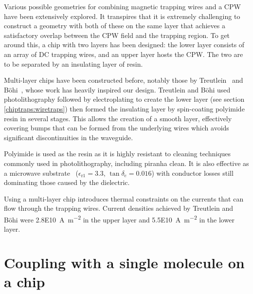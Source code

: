 Various possible geometries for combining magnetic trapping wires and a CPW have
been extensively explored. It transpires that it is extremely challenging to
construct a geometry with both of these on the same layer that achieves a
satisfactory overlap between the CPW field and the trapping region. To get
around this, a chip with two layers has been designed: the lower layer consists
of an array of DC trapping wires, and an upper layer hosts the CPW. The two are
to be separated by an insulating layer of resin.

Multi-layer chips have been constructed before, notably those by
Treutlein~\cite{Treutlein2008} and B\"ohi~\cite{rohtua}, whose work has heavily
inspired our design. Treutlein and B\"ohi used photolithography followed by
electroplating to create the lower layer (see section \ref{chiptraps:wiretraps})
then formed the insulating layer by spin-coating polyimide resin in several
stages. This allows the creation of a smooth layer, effectively covering bumps
that can be formed from the underlying wires which avoids significant
discontinuities in the waveguide.

Polyimide is used as the resin as it is highly resistant to cleaning techniques
commonly used in photolithography, including piranha clean.  It is also
effective as a microwave substrate~\cite{Simons2004} 
($\epsilon_\mathrm{r1} = 3.3$, $\tan\delta_e = 0.016$) with conductor losses
still dominating those caused by the dielectric.

Using a multi-layer chip introduces thermal constraints on the currents that can
flow through the trapping wires. Current densities achieved by Treutlein and
B\"ohi \cite{} were \SI{2.8E10}{\ampere\per\metre\squared} in the upper layer and
\SI{5.5E10}{\ampere\per\metre\squared} in the lower layer.

\section{Coupling with a single molecule on a chip}


